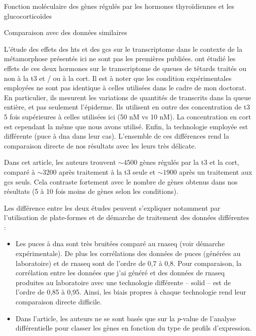 \documentclass[../main.tex]{subfiles}
\begin{document}
\begin{chapter}{Fonction moléculaire des gènes régulés par les hormones thyroïdiennes et les glucocorticoïdes}


\begin{section}{Comparaison avec des données similaires}

L'étude des effets des \glspl{ht} et des \glspl{gc} sur le transcriptome dans le contexte de la métamorphose présentés ici ne sont pas les premières publiées.
\citet{Kulkarni2012} ont étudié les effets de ces deux hormones sur le transcriptome de queues de têtards traités ou non à la \gls{t3} et / ou à la \gls{cort}.
Il est à noter que les condition expérimentales employées ne sont pas identique à celles utilisées dans le cadre de mon doctorat.
En particulier, ils mesurent les variations de quantités de transcrits dans la queue entière, et pas seulement l'épiderme.
Ils utilisent en outre des concentration de \gls{t3} 5 fois supérieures à celles utilisées ici (50 nM vs 10 nM).
La concentration en \gls{cort} est cependant la même que nous avons utilisé.
Enfin, la technologie employée est différente (puce à \gls{dna} dans leur cas).
L'ensemble de ces différences rend la comparaison directe de nos résultats avec les leurs très délicate.
\par
Dans cet article, les auteurs trouvent $\sim 4500$ gènes régulés par la \gls{t3} et la \gls{cort}, comparé à $\sim 3200$ après traitement à la \gls{t3} seule et $\sim 1900$ après un traitement aux \glspl{gc} seuls.
Cela contraste fortement avec le nombre de gènes obtenus dans nos résultats (5 à 10 fois moins de gènes selon les conditions).
\par
Les différence entre les deux études peuvent s'expliquer notamment par l'utilisation de plate-formes et de démarche de traitement des données différentes :
\begin{itemize}
\item Les puces à \gls{dna} sont très bruitées comparé au \gls{rnaseq} (voir démarche expérimentale).
De plus les corrélations des données de puces (générées au laboratoire) et de \gls{rnaseq} sont de l'ordre de 0,7 à 0,8.
Pour comparaison, la corrélation entre les données que j'ai généré et des données de \gls{rnaseq} produites au laboratoire avec une technologie différente – \gls{solid} – est de l'ordre de 0,85 à 0,95.
Ainsi, les biais propres à chaque technologie rend leur comparaison directe difficile.
\item Dans l'article, les auteurs ne se sont basés que sur la \textit{p}-value de l'analyse différentielle pour classer les gènes en fonction du type de profils d'expression.

\end{itemize}
\end{section}
\end{chapter}
\end{document}
